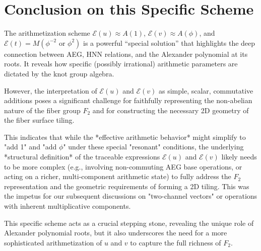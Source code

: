 \documentclass[12pt, a4paper]{article}
\begin{document}
\section{Conclusion on this Specific Scheme}
The arithmetization scheme $\mathcal{E}(u) \approx A(1)$, $\mathcal{E}(v) \approx A(\phi)$, and $\mathcal{E}(t) = M(\phi^{-2} \text{ or } \phi^2)$ is a powerful ``special solution'' that highlights the deep connection between AEG, HNN relations, and the Alexander polynomial at its roots. It reveals how specific (possibly irrational) arithmetic parameters are dictated by the knot group algebra.

However, the interpretation of $\mathcal{E}(u)$ and $\mathcal{E}(v)$ as simple, scalar, commutative additions poses a significant challenge for faithfully representing the non-abelian nature of the fiber group $F_2$ and for constructing the necessary 2D geometry of the fiber surface tiling.

This indicates that while the *effective arithmetic behavior* might simplify to "add 1" and "add $\phi$" under these special "resonant" conditions, the underlying *structural definition* of the traceable expressions $\mathcal{E}(u)$ and $\mathcal{E}(v)$ likely needs to be more complex (e.g., involving non-commuting AEG base operations, or acting on a richer, multi-component arithmetic state) to fully address the $F_2$ representation and the geometric requirements of forming a 2D tiling. This was the impetus for our subsequent discussions on "two-channel vectors" or operations with inherent multiplicative components.

This specific scheme acts as a crucial stepping stone, revealing the unique role of Alexander polynomial roots, but it also underscores the need for a more sophisticated arithmetization of $u$ and $v$ to capture the full richness of $F_2$.
\end{document}
